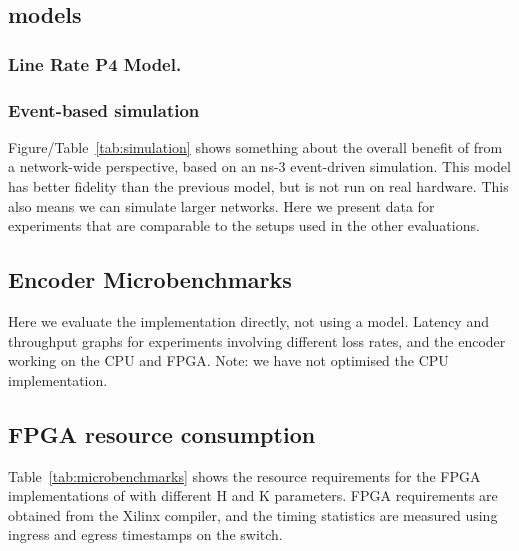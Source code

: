 \subsection{\OurSys models}

\subsubsection{Line Rate P4 Model.} 




\subsubsection{Event-based simulation}
Figure/Table~\ref{tab:simulation} shows something about the overall benefit of \OurSys from a network-wide perspective, based on an ns-3 event-driven simulation.
This model has better fidelity than the previous model, but is not run on real hardware. This also means we can simulate larger networks. Here we present data for experiments that are comparable to the setups used in the other evaluations.


\subsection{Encoder Microbenchmarks}
Here we evaluate the implementation directly, not using a model.
Latency and throughput graphs for experiments involving different loss rates, and the encoder working on the CPU and FPGA.
Note: we have not optimised the CPU implementation.


\subsection{FPGA resource consumption}
Table~\ref{tab:microbenchmarks} shows the resource requirements for the FPGA implementations of
\OurSys with different H and K parameters.
FPGA requirements are obtained from the Xilinx compiler, and the
timing statistics are measured using ingress and egress timestamps on
the switch.


